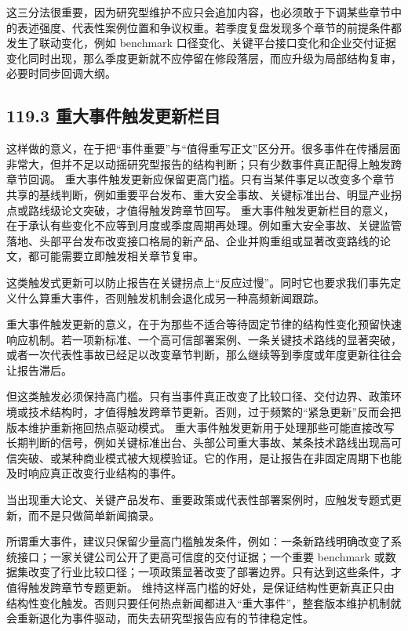 这三分法很重要，因为研究型维护不应只会追加内容，也必须敢于下调某些章节中的表述强度、代表性案例位置和争议权重。若季度复盘发现多个章节的前提条件都发生了联动变化，例如 benchmark 口径变化、关键平台接口变化和企业交付证据变化同时出现，那么季度更新就不应停留在修段落层，而应升级为局部结构复审，必要时同步回调大纲。

\subsection*{119.3 重大事件触发更新栏目}


这样做的意义，在于把“事件重要”与“值得重写正文”区分开。很多事件在传播层面非常大，但并不足以动摇研究型报告的结构判断；只有少数事件真正配得上触发跨章节回调。 重大事件触发更新应保留更高门槛。只有当某件事足以改变多个章节共享的基线判断，例如重要平台发布、重大安全事故、关键标准出台、明显产业拐点或路线级论文突破，才值得触发跨章节回写。 重大事件触发更新栏目的意义，在于承认有些变化不应等到月度或季度周期再处理。例如重大安全事故、关键监管落地、头部平台发布改变接口格局的新产品、企业并购重组或显著改变路线的论文，都可能需要立即触发相关章节复审。

这类触发式更新可以防止报告在关键拐点上“反应过慢”。同时它也要求我们事先定义什么算重大事件，否则触发机制会退化成另一种高频新闻跟踪。

重大事件触发更新的意义，在于为那些不适合等待固定节律的结构性变化预留快速响应机制。若一项新标准、一个高可信部署案例、一条关键技术路线的显著突破，或者一次代表性事故已经足以改变章节判断，那么继续等到季度或年度更新往往会让报告滞后。

但这类触发必须保持高门槛。只有当事件真正改变了比较口径、交付边界、政策环境或技术结构时，才值得触发跨章节更新。否则，过于频繁的“紧急更新”反而会把版本维护重新拖回热点驱动模式。 重大事件触发更新用于处理那些可能直接改写长期判断的信号，例如关键标准出台、头部公司重大事故、某条技术路线出现高可信突破、或某种商业模式被大规模验证。它的作用，是让报告在非固定周期下也能及时响应真正改变行业结构的事件。

当出现重大论文、关键产品发布、重要政策或代表性部署案例时，应触发专题式更新，而不是只做简单新闻摘录。

所谓重大事件，建议只保留少量高门槛触发条件，例如：一条新路线明确改变了系统接口；一家关键公司公开了更高可信度的交付证据；一个重要 benchmark 或数据集改变了行业比较口径；一项政策显著改变了部署边界。只有达到这些条件，才值得触发跨章节专题更新。 维持这样高门槛的好处，是保证结构性更新真正只由结构性变化触发。否则只要任何热点新闻都进入“重大事件”，整套版本维护机制就会重新退化为事件驱动，而失去研究型报告应有的节律稳定性。

